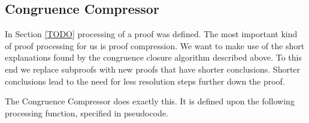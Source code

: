\subsection*{Congruence Compressor}

In Section \ref{TODO} processing of a proof was defined.
The most important kind of proof processing for us is proof compression.
We want to make use of the short explanations found by the congruence closure algorithm described above.
To this end we replace subproofs with new proofs that have shorter conclusions.
Shorter conclusions lead to the need for less resolution steps further down the proof.

The Congruence Compressor does exactly this. It is defined upon the following processing function, specified in pseudocode.

